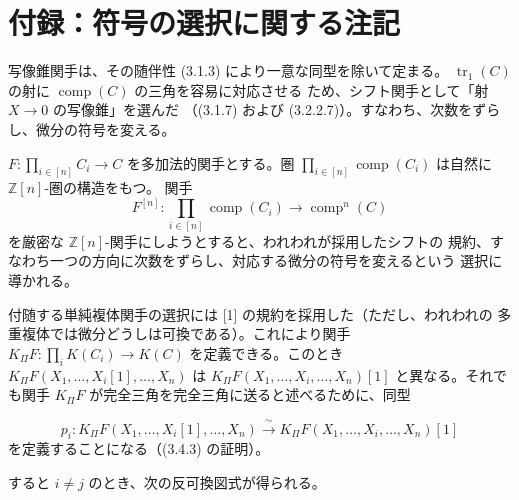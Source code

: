 \clearpage
{}%
\begingroup
\small
\setlength{\abovedisplayskip}{4pt plus 2pt minus 2pt}%
\setlength{\belowdisplayskip}{4pt plus 2pt minus 2pt}%

\section*{付録：符号の選択に関する注記}

写像錐関手は、その随伴性 (3.1.3) により一意な同型を除いて定まる。
$\operatorname{tr}_1(C)$ の射に $\operatorname{comp}(C)$ の三角を容易に対応させる
ため、シフト関手として「射 $X\longrightarrow 0$ の写像錐」を選んだ
（(3.1.7) および (3.2.2.7)）。すなわち、次数をずらし、微分の符号を変える。

$F\colon\prod_{i\in[n]}C_i\longrightarrow C$ を多加法的関手とする。圏
$\prod_{i\in[n]}\operatorname{comp}(C_i)$ は自然に $\mathbb Z[n]$-圏の構造をもつ。
関手
\[
  F^{[n]}\colon\prod_{i\in[n]}\operatorname{comp}(C_i)
  \longrightarrow\operatorname{comp}^{n}(C)
\]
を厳密な $\mathbb Z[n]$-関手にしようとすると、われわれが採用したシフトの
規約、すなわち一つの方向に次数をずらし、対応する微分の符号を変えるという
選択に導かれる。

付随する単純複体関手の選択には [1] の規約を採用した（ただし、われわれの
多重複体では微分どうしは可換である）。これにより関手
$K_{\Pi}F\colon\prod_i K(C_i)\longrightarrow K(C)$ を定義できる。このとき
$K_{\Pi}F(X_1,\ldots,X_i[1],\ldots,X_n)$ は
$K_{\Pi}F(X_1,\ldots,X_i,\ldots,X_n)[1]$ と異なる。それでも関手
$K_{\Pi}F$ が完全三角を完全三角に送ると述べるために、同型

\[
  p_i\colon K_{\Pi}F(X_1,\ldots,X_i[1],\ldots,X_n)
  \xrightarrow{\ \sim\ }
  K_{\Pi}F(X_1,\ldots,X_i,\ldots,X_n)[1]
\]
を定義することになる（(3.4.3) の証明）。

すると $i\ne j$ のとき、次の反可換図式が得られる。

\begin{center}
\end{center}


